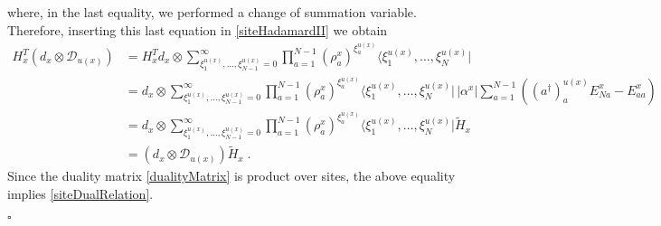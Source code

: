 \documentclass[10pt]{article}
\numberwithin{equation}{section}
\numberwithin{equation}{subsection}
\newcommand{\dt}{\;.}
\newcommand{\dd}{\mathcal{D}_{u(x)}}
\begin{document}
where, in the last equality, we performed a change of summation variable. Therefore, inserting this last equation in \eqref{siteHadamardII} we obtain 
\begin{equation}
    \begin{split}
H_{x}^{T}\left(d_{x}\otimes \dd\right)&=
     H_{x}^{T}d_{x}\otimes \sum_{\xi_{1}^{u(x)},\ldots,\xi_{N-1}^{u(x)}=0}^{\infty}\prod_{a=1}^{N-1}\left(\rho_{a}^{x}\right)^{\xi_{a}^{u(x)}}\langle \xi_{1}^{u(x)},\ldots,\xi_{N}^{u(x)}|
\\&=
d_{x}\otimes \sum_{\xi_{1}^{u(x)},\ldots,\xi_{N-1}^{u(x)}=0}^{\infty}\prod_{a=1}^{N-1}\left(\rho_{a}^{x}\right)^{\xi_{a}^{u(x)}}\langle \xi_{1}^{u(x)},\ldots,\xi_{N}^{u(x)}|\,|\alpha^{x}|\sum_{a=1}^{N-1}\left((a^{\dagger})_{a}^{u(x)}E_{Na}^{x}-E_{aa}^{x}\right)   
\\&=
d_{x}\otimes \sum_{\xi_{1}^{u(x)},\ldots,\xi_{N-1}^{u(x)}=0}^{\infty}\prod_{a=1}^{N-1}\left(\rho_{a}^{x}\right)^{\xi_{a}^{u(x)}}\langle \xi_{1}^{u(x)},\ldots,\xi_{N}^{u(x)}|\widetilde{H}_{x}
\\&=
\left(d_{x}\otimes \dd\right)\widetilde{H}_{x}\dt
    \end{split}
\end{equation}
Since the duality matrix \eqref{dualityMatrix} is product over sites, the above equality implies \eqref{siteDualRelation}. 
\begin{flushright}
$\square$
\end{flushright}
\end{document}
